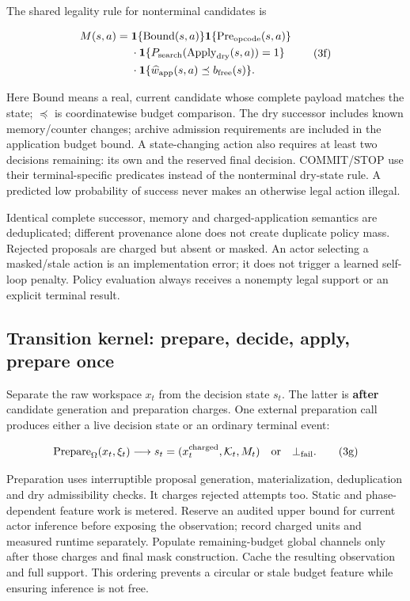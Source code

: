 \documentclass[10pt,a4paper]{article}
\begin{document}
\endgroup

The shared legality rule for nonterminal candidates is

\[
\begin{aligned}
M(s,a)={}&\mathbf1\{\mathrm{Bound}(s,a)\}
\mathbf1\{\mathrm{Pre}_{\rm opcode}(s,a)\}\\
&\cdot\mathbf1\{P_{\rm search}(\mathrm{Apply}_{\rm dry}(s,a))=1\}\\
&\cdot\mathbf1\{\widehat w_{\rm app}(s,a)\preceq b_{\rm free}(s)\}.
\end{aligned}
\tag{3f}
\]

Here \(\mathrm{Bound}\) means a real, current candidate whose complete
payload matches the state; \(\preceq\) is coordinatewise budget
comparison. The dry successor includes known memory/counter changes;
archive admission requirements are included in the application budget
bound. A state-changing action also requires at least two decisions
remaining: its own and the reserved final decision. COMMIT/STOP use
their terminal-specific predicates instead of the nonterminal dry-state
rule. A predicted low probability of success never makes an otherwise
legal action illegal.

Identical complete successor, memory and charged-application semantics
are deduplicated; different provenance alone does not create duplicate
policy mass. Rejected proposals are charged but absent or masked. An
actor selecting a masked/stale action is an implementation error; it
does not trigger a learned self-loop penalty. Policy evaluation always
receives a nonempty legal support or an explicit terminal result.

\hypertarget{transition-kernel-prepare-decide-apply-prepare-once}{%
\subsection{Transition kernel: prepare, decide, apply, prepare
once}\label{transition-kernel-prepare-decide-apply-prepare-once}}

Separate the raw workspace \(x_t\) from the decision state \(s_t\). The
latter is \textbf{after} candidate generation and preparation charges.
One external preparation call produces either a live decision state or
an ordinary terminal event:

\[
\mathrm{Prepare}_\Omega(x_t,\xi_t)\longrightarrow
s_t=(x_t^{\rm charged},\mathcal K_t,M_t)
\quad\text{or}\quad \bot_{\rm fail}.
\tag{3g}
\]

Preparation uses interruptible proposal generation, materialization,
deduplication and dry admissibility checks. It charges rejected attempts
too. Static and phase-dependent feature work is metered. Reserve an
audited upper bound for current actor inference before exposing the
observation; record charged units and measured runtime separately.
Populate remaining-budget global channels only after those charges and
final mask construction. Cache the resulting observation and full
support. This ordering prevents a circular or stale budget feature while
ensuring inference is not free.
\end{document}
